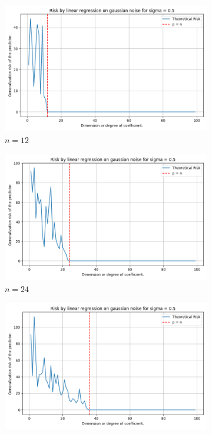 \documentclass{article}
\begin{document}
\begin{figure}[htb]
  \centering
  \newcommand{\imgwidth}{0.22\textwidth}

  \begin{subfigure}[b]{\imgwidth}
    \includegraphics[width=\linewidth]{img/descent_devel_t1.png}
    \caption{$n=12$}\label{fig:1a21}
  \end{subfigure}%
  \hfill
  \begin{subfigure}[b]{\imgwidth}
    \includegraphics[width=\linewidth]{img/descent_devel_t2.png}
    \caption{$n=24$}\label{fig:1b21}
  \end{subfigure}%
  \hfill
  \begin{subfigure}[b]{\imgwidth}
    \includegraphics[width=\linewidth]{img/descent_devel_t3.png}

\end{subfigure}
\end{figure}
\end{document}
